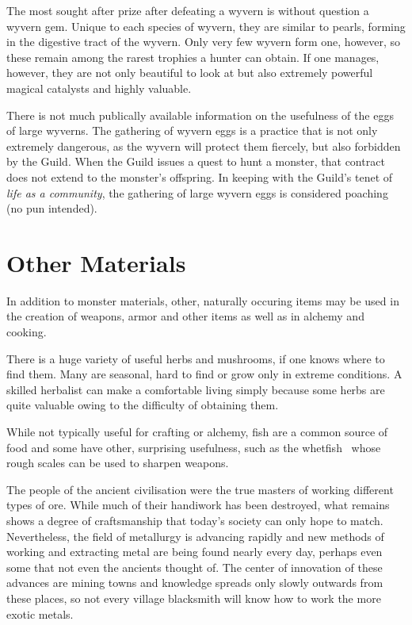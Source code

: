 The most sought after prize after defeating a wyvern is without question a wyvern gem. Unique to each species of wyvern, they are similar to pearls, forming in the digestive tract of the wyvern. Only very few wyvern form one, however, so these remain among the rarest trophies a hunter can obtain. If one manages, however, they are not only beautiful to look at but also extremely powerful magical catalysts and highly valuable.

There is not much publically available information on the usefulness of the eggs of large wyverns. The gathering of wyvern eggs is a practice that is not only extremely dangerous, as the wyvern will protect them fiercely, but also forbidden by the Guild. When the Guild issues a quest to hunt a monster, that contract does not extend to the monster's offspring. In keeping with the Guild's tenet of \emph{life as a community}, the gathering of large wyvern eggs is considered poaching (no pun intended).


\section{Other Materials}
In addition to monster materials, other, naturally occuring items may be used in the creation of weapons, armor and other items as well as in alchemy and cooking.

There is a huge variety of useful herbs and mushrooms, if one knows where to find them. Many are seasonal, hard to find or grow only in extreme conditions. A skilled herbalist can make a comfortable living simply because some herbs are quite valuable owing to the difficulty of obtaining them.

While not typically useful for crafting or alchemy, fish are a common source of food and some have other, surprising usefulness, such as the whetfish~ whose rough scales can be used to sharpen weapons.

The people of the ancient civilisation were the true masters of working different types of ore. While much of their handiwork has been destroyed, what remains shows a degree of craftsmanship that today's society can only hope to match. Nevertheless, the field of metallurgy is advancing rapidly and new methods of working and extracting metal are being found nearly every day, perhaps even some that not even the ancients thought of. The center of innovation of these advances are mining towns and knowledge spreads only slowly outwards from these places, so not every village blacksmith will know how to work the more exotic metals.

